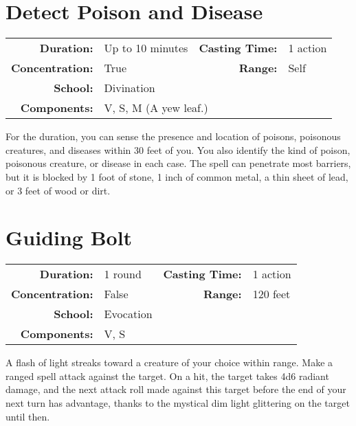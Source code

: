 \documentclass[a5paper, 12pt]{memoir}
\begin{document}
\newpage
\section*{Detect Poison and Disease}

{
\small\centering\vspace{-6pt}
\begin{tabular}{rlrl}
\toprule

\textbf{Duration:} & Up to 10 minutes &
\textbf{Casting Time:} & 1 action \\
\textbf{Concentration:} & True &
\textbf{Range:} & Self \\
\textbf{School:} & Divination \\
\textbf{Components:} & \multicolumn{3}{p{0.7\textwidth}}{V, S, M (A yew leaf.)}\\

\bottomrule
\end{tabular}
}

\vspace{1\baselineskip}\noindent For the duration, you can sense the presence and location of poisons, poisonous creatures, and diseases within 30 feet of you. You also identify the kind of poison, poisonous creature, or disease in each case. The spell can penetrate most barriers, but it is blocked by 1 foot of stone, 1 inch of common metal, a thin sheet of lead, or 3 feet of wood or dirt.

\newpage
\section*{Guiding Bolt}

{
\small\centering\vspace{-6pt}
\begin{tabular}{rlrl}
\toprule

\textbf{Duration:} & 1 round &
\textbf{Casting Time:} & 1 action \\
\textbf{Concentration:} & False &
\textbf{Range:} & 120 feet \\
\textbf{School:} & Evocation \\
\textbf{Components:} & \multicolumn{3}{p{0.7\textwidth}}{V, S}\\

\bottomrule
\end{tabular}
}

\vspace{1\baselineskip}\noindent A flash of light streaks toward a creature of your choice within range. Make a ranged spell attack against the target. On a hit, the target takes 4d6 radiant damage, and the next attack roll made against this target before the end of your next turn has advantage, thanks to the mystical dim light glittering on the target until then.
\end{document}
